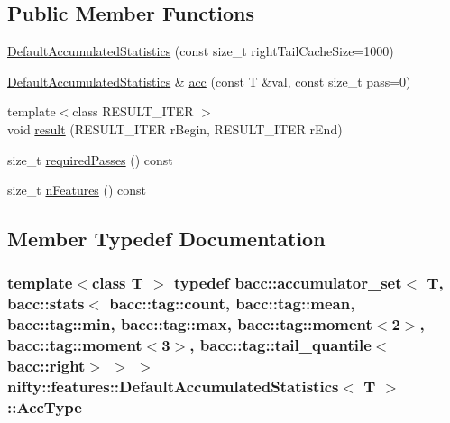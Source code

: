\subsection*{Public Member Functions}
\begin{DoxyCompactItemize}
\item 
\hyperlink{classnifty_1_1features_1_1DefaultAccumulatedStatistics_a21c759b494f3d6476e414dd6607c05e8}{Default\+Accumulated\+Statistics} (const size\+\_\+t right\+Tail\+Cache\+Size=1000)
\item 
\hyperlink{classnifty_1_1features_1_1DefaultAccumulatedStatistics}{Default\+Accumulated\+Statistics} \& \hyperlink{classnifty_1_1features_1_1DefaultAccumulatedStatistics_a3cddf901950504afb3eacb8f2277c572}{acc} (const T \&val, const size\+\_\+t pass=0)
\item 
{\footnotesize template$<$class R\+E\+S\+U\+L\+T\+\_\+\+I\+T\+E\+R $>$ }\\void \hyperlink{classnifty_1_1features_1_1DefaultAccumulatedStatistics_a7adfcf8f044bb58815f95e925a350a4e}{result} (R\+E\+S\+U\+L\+T\+\_\+\+I\+T\+E\+R r\+Begin, R\+E\+S\+U\+L\+T\+\_\+\+I\+T\+E\+R r\+End)
\item 
size\+\_\+t \hyperlink{classnifty_1_1features_1_1DefaultAccumulatedStatistics_a2812443d25fd439e6890963e9a1a621a}{required\+Passes} () const 
\item 
size\+\_\+t \hyperlink{classnifty_1_1features_1_1DefaultAccumulatedStatistics_ab7711c81e77411fdc0b5b51b24cf7a4c}{n\+Features} () const 
\end{DoxyCompactItemize}


\subsection{Member Typedef Documentation}
\hypertarget{classnifty_1_1features_1_1DefaultAccumulatedStatistics_a1b5957732304d0ef906515d7229d8b7a}{}
\subsubsection[{Acc\+Type}]{\setlength{\rightskip}{0pt plus 5cm}template$<$class T $>$ typedef bacc\+::accumulator\+\_\+set$<$ T, bacc\+::stats$<$ bacc\+::tag\+::count, bacc\+::tag\+::mean, bacc\+::tag\+::min, bacc\+::tag\+::max, bacc\+::tag\+::moment$<$2$>$, bacc\+::tag\+::moment$<$3$>$, bacc\+::tag\+::tail\+\_\+quantile$<$bacc\+::right$>$ $>$ $>$ {\bf nifty\+::features\+::\+Default\+Accumulated\+Statistics}$<$ T $>$\+::{\bf Acc\+Type}}\label{classnifty_1_1features_1_1DefaultAccumulatedStatistics_a1b5957732304d0ef906515d7229d8b7a}
\hypertarget{classnifty_1_1features_1_1DefaultAccumulatedStatistics_acf47a025351ecf2d9427c10a2427c412}{}
